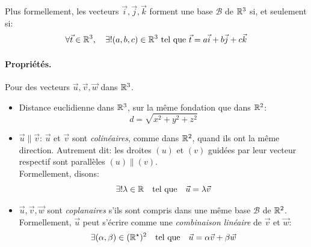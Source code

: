 \documentclass[12pt]{article}
\begin{document}
Plus formellement, les vecteurs $\vec{i}, \vec{j}, \vec{k}$ 
forment une base $\mathcal{B}$ de $\mathbb{R}^3$ si, et seulement si: $$
    \forall \vec{t} \in \mathbb{R}^3, \quad
    \exists! (a, b, c) \in \mathbb{R}^3 \text{ tel que } 
    \vec{t} = a\vec{i} + b\vec{j} + c\vec{k} 
$$

\paragraph{Propriétés.}
Pour des vecteurs $\vec{u}, \vec{v}, \vec{w}$ dans $\mathbb{R}^3$.

\begin{itemize}
    \item Distance euclidienne dans $\mathbb{R}^3$, sur la même fondation que dans $\mathbb{R}^2$: $$
        d = \sqrt{x^2 + y^2 + z^2}
    $$
    \item $\vec{u} \parallel \vec{v}$: $\vec{u}$ et $\vec{v}$ sont \textit{colinéaires},
        comme dans $\mathbb{R}^2$, quand ils ont la même direction.
        Autrement dit: les droites $(u)$ et $(v)$ guidées par leur vecteur
        respectif sont parallèles $(u) \parallel (v)$. \\
        Formellement, disons: $$
            \exists! \lambda \in \mathbb{R} \quad \text{tel que} \quad
            \vec{u} = \lambda \vec{v}
        $$ 
    \item $\vec{u}, \vec{v}, \vec{w}$ sont \textit{coplanaires} s'ils sont compris
        dans une même base $\mathcal{B}$ de $\mathbb{R}^2$. \\
        Formellement, $\vec{u}$ peut s'écrire comme une 
        \textit{combinaison linéaire} de $\vec{v}$ et $\vec{w}$: $$
            \exists(\alpha, \beta) \in (\mathbb{R}^{\star})^2 \quad \text{tel que} \quad
            \vec{u} = \alpha \vec{v} + \beta \vec{w}
        $$
\end{itemize}
\end{document}

